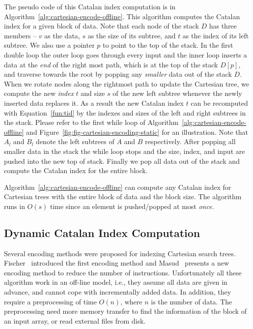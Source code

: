 The pseudo code of this Catalan index computation is in
Algorithm~\ref{alg:cartesian-encode-offline}.  This algorithm computes
the Catalan index for a given block of data.  Note that each node of
the stack $D$ has three members -- $v$ as the data, $s$ as the size of
its subtree, and $t$ as the index of its left subtree.  We also use a
pointer $p$ to point to the top of the stack.  In the first double
loop the outer loop goes through every input and the inner loop
inserts a data at the {\em end} of the right most path, which is at
the top of the stack $D[p]$, and traverse towards the root by popping
any {\em smaller} data out of the stack $D$.  When we rotate nodes
along the rightmost path to update the Cartesian tree, we compute the
new {\em index} $t$ and size $s$ of the new left subtree whenever the
newly inserted data replaces it.  As a result the new Catalan index
$t$ can be recomputed with Equation~\ref{fun:tid} by the indexes and
sizes of the left and right subtrees in the stack.  Please refer to
the first while loop of Algorithm~\ref{alg:cartesian-encode-offline}
and Figure~\ref{fig:fig-cartesian-encoding-static} for an
illustration.  Note that $A_l$ and $B_l$ denote the left subtrees of
$A$ and $B$ respectively.  After popping all smaller data in the stack
the while loop stops and the size, index, and input are pushed into
the new top of stack.  Finally we pop all data out of the stack and
compute the Catalan index for the entire block.

Algorithm~\ref{alg:cartesian-encode-offline} can compute any Catalan
index for Cartesian trees with the entire block of data and the block
size.  The algorithm runs in $O(s)$ time since an element is
pushed/popped at most {\em once}.



\subsection{Dynamic Catalan Index Computation}

Several encoding methods were proposed for indexing Cartesian search
trees.  Fischer~\cite{Fischer2006TheoreticalAP} introduced the first
encoding method and Masud~\cite{Hasan2010CacheOA} presents a new
encoding method to reduce the number of instructions.  Unfortunately
all these algorithm work in an off-line model, i.e., they assume all
data are given in advance, and cannot cope with incrementally added
data.  In addition, they require a preprocessing of time $O(n)$, where
$n$ is the number of data.  The preprocessing need more memory
transfer to find the information of the block of an input array, or
read external files from disk.

